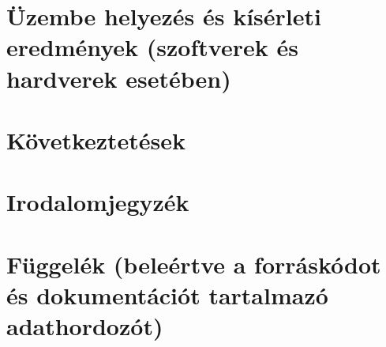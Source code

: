 \documentclass[a4paper, 11pt]{article}
\begin{document}
\section{Üzembe helyezés és kísérleti eredmények (szoftverek és hardverek esetében)}\label{sec:testcases}

\section{Következtetések}\label{sec:conc}

\section{Irodalomjegyzék}\label{sec:irod}
%
\printbibliography[title={\ }]

\section{Függelék (beleértve a forráskódot és dokumentációt tartalmazó adathordozót)}\label{sec:dep}
\end{document}
